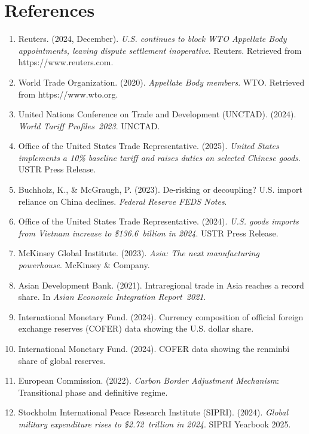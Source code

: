 \documentclass[12pt]{article}
\begin{document}
\section{References}
\begin{enumerate}
\item Reuters. (2024, December). \textit{U.S. continues to block WTO Appellate Body appointments, leaving dispute settlement inoperative}. Reuters. Retrieved from https://www.reuters.com.
\item World Trade Organization. (2020). \textit{Appellate Body members}. WTO. Retrieved from https://www.wto.org.
\item United Nations Conference on Trade and Development (UNCTAD). (2024). \textit{World Tariff Profiles 2023}. UNCTAD.
\item Office of the United States Trade Representative. (2025). \textit{United States implements a 10\% baseline tariff and raises duties on selected Chinese goods}. USTR Press Release.
\item Buchholz, K., \& McGraugh, P. (2023). De-risking or decoupling? U.S. import reliance on China declines. \textit{Federal Reserve FEDS Notes}.
\item Office of the United States Trade Representative. (2024). \textit{U.S. goods imports from Vietnam increase to \$136.6 billion in 2024}. USTR Press Release.
\item McKinsey Global Institute. (2023). \textit{Asia: The next manufacturing powerhouse}. McKinsey \& Company.
\item Asian Development Bank. (2021). Intraregional trade in Asia reaches a record share. In \textit{Asian Economic Integration Report 2021}.
\item International Monetary Fund. (2024). Currency composition of official foreign exchange reserves (COFER) data showing the U.S. dollar share.
\item International Monetary Fund. (2024). COFER data showing the renminbi share of global reserves.
\item European Commission. (2022). \textit{Carbon Border Adjustment Mechanism}: Transitional phase and definitive regime.
\item Stockholm International Peace Research Institute (SIPRI). (2024). \textit{Global military expenditure rises to \$2.72 trillion in 2024}. SIPRI Yearbook 2025.

\end{enumerate}
\end{document}
